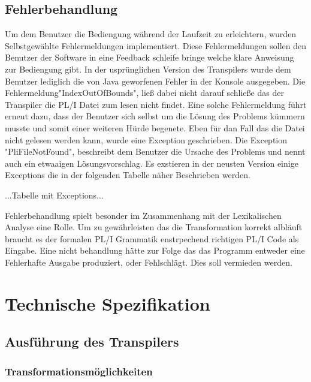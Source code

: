 


\subsection{Fehlerbehandlung}
Um dem Benutzer die Bediengung während der Laufzeit zu erleichtern, wurden Selbstgewählte Fehlermeldungen implementiert. Diese Fehlermeldungen sollen den Benutzer der Software in eine Feedback schleife bringe welche klare Anweisung zur Bediengung gibt. In der usprünglichen Version des Transpilers wurde dem Benutzer lediglich die von Java geworfenen Fehler in der Konsole ausgegeben. Die Fehlermeldung"IndexOutOfBounds", ließ dabei nicht darauf schließe das der Transpiler die PL/I Datei zum lesen nicht findet. Eine solche Fehlermeldung führt erneut dazu, dass der Benutzer sich selbst um die Lösung des Problems kümmern musste und somit einer weiteren Hürde begenete.
Eben für dan Fall das die Datei nicht gelesen werden kann, wurde eine Exception geschrieben. Die Exception "PliFileNotFound", beschreibt dem Benutzer die Ursache des Problems und nennt auch ein etwaaigen Lösungsvorschlag. Es exstieren in der neusten Version einige Exceptions die in der folgenden Tabelle näher Beschrieben werden.

...Tabelle mit Exceptions...

Fehlerbehandlung spielt besonder im Zusammenhang mit der Lexikalischen Analyse eine Rolle. Um zu gewährleisten das die Transformation korrekt albläuft braucht es der formalen PL/I Grammatik enstrpechend richtigen PL/I Code als Eingabe. Eine nicht behandlung hätte zur Folge das das Programm entweder eine Fehlerhafte Ausgabe produziert, oder Fehlschlägt. Dies soll vermieden werden.

\section{Technische Spezifikation}
	\subsection{Ausführung des Transpilers}
		\subsubsection{Transformationsmöglichkeiten}
